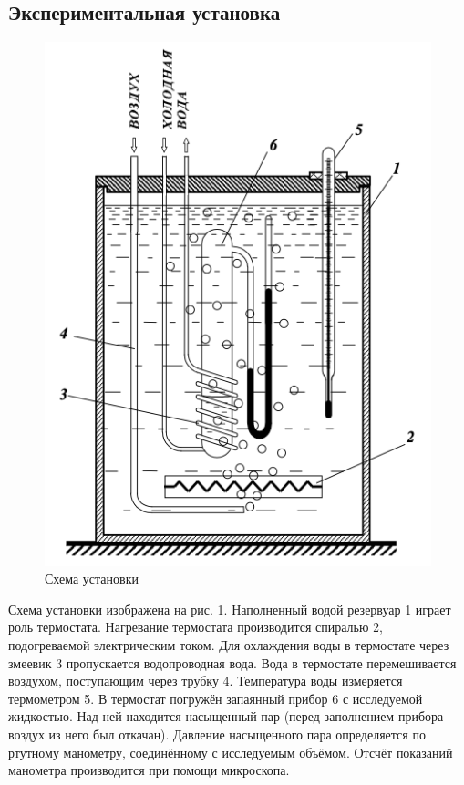 \documentclass[12pt,a4paper]{article}
\begin{document}
\subsection*{Экспериментальная установка}
\begin{figure}
    \centering
    \includegraphics[scale=0.7]{scheme1.jpeg} 
    \caption{Схема установки}
\end{figure}
Схема
установки изображена на рис. 1. 
Наполненный водой резервуар 1 играет роль термостата. 
Нагревание термостата производится спиралью 2, подогреваемой электрическим током. 
Для охлаждения воды в термостате через змеевик 3 пропускается водопроводная вода. 
Вода в термостате перемешивается воздухом, поступающим через трубку 4. 
Температура воды измеряется термометром 5. 
В термостат погружён запаянный прибор 6 с исследуемой жидкостью. 
Над ней находится насыщенный пар (перед заполнением прибора воздух из него был откачан). 
Давление насыщенного пара определяется по ртутному манометру, соединённому с исследуемым объёмом. 
Отсчёт показаний манометра производится при помощи микроскопа.
\end{document}
